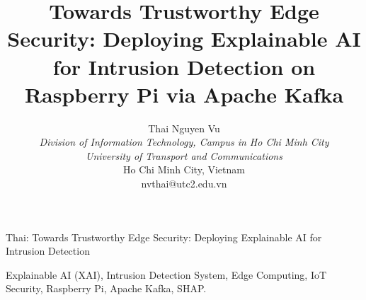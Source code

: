 \documentclass[journal,10pt]{IEEEtran}
\begin{document}
\title{Towards Trustworthy Edge Security: Deploying Explainable AI for Intrusion Detection on Raspberry Pi via Apache Kafka}

\author{Thai Nguyen Vu \\
\textit{Division of Information Technology, Campus in Ho Chi Minh City} \\
\textit{University of Transport and Communications} \\
Ho Chi Minh City, Vietnam \\
nvthai@utc2.edu.vn}
%
{Thai: Towards Trustworthy Edge Security: Deploying Explainable AI for Intrusion Detection}

\maketitle



\begin{IEEEkeywords}
Explainable AI (XAI), Intrusion Detection System, Edge Computing, IoT Security, Raspberry Pi, Apache Kafka, SHAP.
\end{IEEEkeywords}








\end{document}
